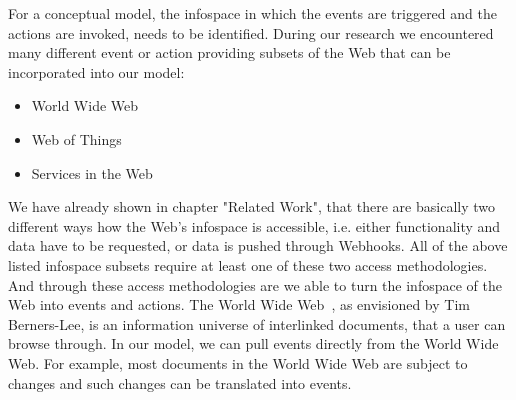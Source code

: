 


For a conceptual model, the \textrm{\textrm{\gls{infospace}}} in which the events are triggered and the actions are invoked, needs to be identified.
During our research we encountered many different event or action providing subsets of the Web that can be incorporated into our model:
\begin{itemize}
  \item \textrm{World Wide Web}
  \item \textrm{Web of Things}
  \item Services in the Web
\end{itemize}
We have already shown in chapter "Related Work", that there are basically two different ways how the Web's \textrm{\gls{infospace}} is accessible, i.e. either functionality and data have to be requested, or data is pushed through Webhooks.
All of the above listed \textrm{\gls{infospace}} subsets require at least one of these two access methodologies.
And through these access methodologies are we able to turn the \textrm{\gls{infospace}} of the Web into events and actions.
The \textrm{World Wide Web}~\cite{DBLP:journals/en/Berners-LeeCGP92}, as envisioned by Tim Berners-Lee, is an information universe of interlinked documents, that a user can browse through.
In our model, we can pull events directly from the World Wide Web.
For example, most documents in the World Wide Web are subject to changes and such changes can be translated into events.


